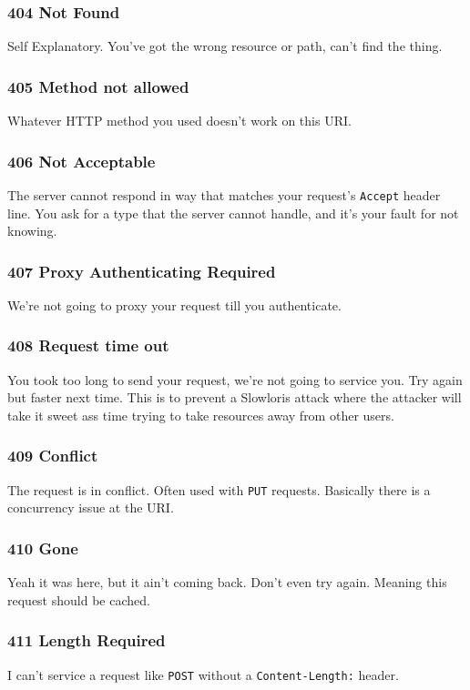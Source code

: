 \documentclass[../CMPUT-404-Notes.tex]{subfiles}
\begin{document}
\subsubsection{404 Not Found}
Self Explanatory. You've got the wrong resource or path, can't find the thing.

\subsubsection{405 Method not allowed}
Whatever HTTP method you used doesn't work on this URI.


\subsubsection{406 Not Acceptable}
The server cannot respond in way that matches your request's \texttt{Accept} header line.
You ask for a type that the server cannot handle, and it's your fault for not knowing.

\subsubsection{407 Proxy Authenticating Required}
We're not going to proxy your request till you authenticate.

\subsubsection{408 Request time out}
You took too long to send your request, we're not going to service you. Try again but faster next time.
This is to prevent a Slowloris attack where the attacker will take it sweet ass time trying to take resources away from other users.

\subsubsection{409 Conflict}
The request is in conflict. Often used with \texttt{PUT} requests. Basically there is a concurrency issue at the URI.

\subsubsection{410 Gone}
Yeah it was here, but it ain't coming back. Don't even try again. Meaning this request should be cached. 

\subsubsection{411 Length Required}
I can't service a request like \texttt{POST} without a \texttt{Content-Length:} header. 
\end{document}
